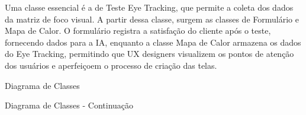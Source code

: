 Uma classe essencial é a de Teste Eye Tracking, que permite a coleta dos dados da matriz de foco visual. A partir dessa classe, surgem as classes de Formulário e Mapa de Calor. O formulário registra a satisfação do cliente após o teste, fornecendo dados para a IA, enquanto a classe Mapa de Calor armazena os dados do Eye Tracking, permitindo que UX designers visualizem os pontos de atenção dos usuários e aperfeiçoem o processo de criação das telas.\newline

\begin{photograph}[H]
    \centering
    \caption{Diagrama de Classes}%
    \label{phot:pg-classes}
    \end{photograph}
    
    \vspace{12pt}

    \begin{photograph}[H]
        \centering
        \caption{Diagrama de Classes - Continuação}%
        \label{phot:pg-classes2}
        \end{photograph}

